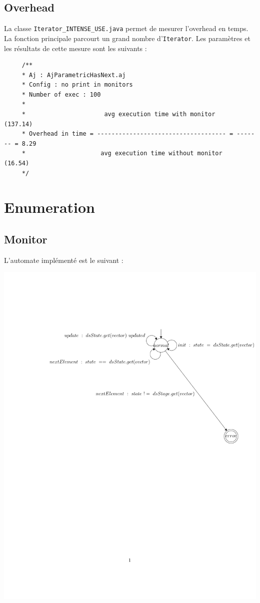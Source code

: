 \documentclass{article}
\begin{document}
\subsection{Overhead}

La classe \texttt{Iterator\_INTENSE\_USE.java} permet de mesurer l'overhead en
temps.
La fonction principale parcourt un grand nombre d'\texttt{Iterator}. Les paramètres
et les résultats de cette mesure sont les suivants :

\vspace{0.3cm}
\begin{verbatim}
     /**
     * Aj : AjParametricHasNext.aj
     * Config : no print in monitors 
     * Number of exec : 100
     * 
     *                      avg execution time with monitor      (137.14)
     * Overhead in time = ------------------------------------ = ------- = 8.29
     *                     avg execution time without monitor    (16.54)
     */
\end{verbatim}


\section{Enumeration}

\subsection{Monitor}

L'automate implémenté est le
suivant :

\begin{center}
\includegraphics[width=14.5cm, clip, trim=3cm 12.5cm 0cm
4cm]{enumeration.pdf}
\end{center}
\end{document}
